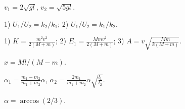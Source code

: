 \begin{Answer}{81}
$v_1 = 2\sqrt{gl}$, $v_2 = \sqrt{5gl}$.
\end{Answer}
\begin{Answer}{82}
1) $U_1/U_2 = k_2/k_1$; 2) $U_1/U_2 = k_1/k_2$.
\end{Answer}
\begin{Answer}{83}
1) $K=\frac{m^2v^2}{2(M+m)}$; 2) $E_1 = \frac{Mmv^2}{2(M+m)}$; 3) $A = v\sqrt{\frac{Mm}{k(M+m)}}$.
\end{Answer}
\begin{Answer}{84}
$x = Ml/(M-m)$.
\end{Answer}
\begin{Answer}{85}
$\alpha_1 =\frac{m_1-m_2}{m_1+m_2}\alpha$, $\alpha_2 =\frac{2m_1}{m_1+m_2}\alpha \sqrt{\frac{l_1}{l_2}}$.
\end{Answer}
\begin{Answer}{86}
$\alpha = \arccos(2/3)$.
\end{Answer}

